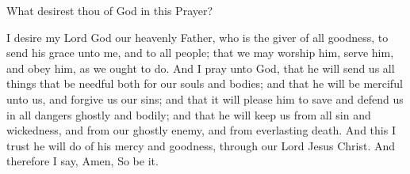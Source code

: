 \centerline{}
\ourFather

 What desirest thou of God in this Prayer?

 I desire my Lord God our heavenly Father, who is the giver of all goodness, to send his grace unto me, and to all people; that we may worship him, serve him, and obey him, as we ought to do. And I pray unto God, that he will send us all things that be needful both for our souls and bodies; and that he will be merciful unto us, and forgive us our sins; and that it will please him to save and defend us in all dangers ghostly and bodily; and that he will keep us from all sin and wickedness, and from our ghostly enemy, and from everlasting death. And this I trust he will do of his mercy and goodness, through our Lord Jesus Christ. And therefore I say, Amen, So be it.













